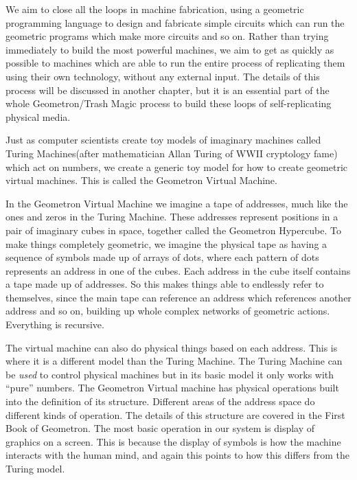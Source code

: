 We aim to close all the loops in machine fabrication, using a geometric
programming language to design and fabricate simple circuits which can
run the geometric programs which make more circuits and so on. Rather
than trying immediately to build the most powerful machines, we aim to
get as quickly as possible to machines which are able to run the entire
process of replicating them using their own technology, without any
external input. The details of this process will be discussed in another
chapter, but it is an essential part of the whole Geometron/Trash Magic
process to build these loops of self-replicating physical media.

Just as computer scientists create toy models of imaginary machines
called Turing Machines(after mathematician Allan Turing of WWII
cryptology fame) which act on numbers, we create a generic toy model for
how to create geometric virtual machines. This is called the Geometron
Virtual Machine.

In the Geometron Virtual Machine we imagine a tape of addresses, much
like the ones and zeros in the Turing Machine. These addresses represent
positions in a pair of imaginary cubes in space, together called the
Geometron Hypercube. To make things completely geometric, we imagine the
physical tape as having a sequence of symbols made up of arrays of dots,
where each pattern of dots represents an address in one of the cubes.
Each address in the cube itself contains a tape made up of addresses. So
this makes things able to endlessly refer to themselves, since the main
tape can reference an address which references another address and so
on, building up whole complex networks of geometric actions. Everything
is recursive.

The virtual machine can also do physical things based on each address.
This is where it is a different model than the Turing Machine. The
Turing Machine can be \emph{used} to control physical machines but in
its basic model it only works with ``pure'' numbers. The Geometron
Virtual machine has physical operations built into the definition of its
structure. Different areas of the address space do different kinds of
operation. The details of this structure are covered in the First Book
of Geometron. The most basic operation in our system is display of
graphics on a screen. This is because the display of symbols is how the
machine interacts with the human mind, and again this points to how this
differs from the Turing model.

